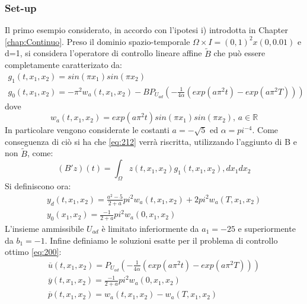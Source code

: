 \subsubsection{Set-up}
Il primo esempio considerato, in accordo con l'ipotesi i) introdotta in Chapter \ref{chap:Continuo}.
Preso il dominio spazio-temporale $\Omega \times I = (0,1)^2 x(0,0.01)$ e d=1, si considera l'operatore di controllo lineare affine $\tilde{B}$ che può essere completamente caratterizato da:
{\renewcommand\arraystretch{2}
\begin{equation}
\begin{array}{c}
g_1(t,x_1,x_2) = sin({\pi}x_1)sin({\pi}x_2)\\
g_0(t,x_1,x_2) = -{\pi}^2w_a(t,x_1,x_2) - BP_{U_{ad}} \left( -\frac{1}{4\alpha}(exp(a{\pi}^2t)-exp(a{\pi}^2T)) \right)
\end{array}
\label{eq:500}
\end{equation}
}
dove
\begin{equation}
w_a(t,x_1,x_2) = exp(a{\pi}^2t)sin({\pi}x_1)sin({\pi}x_2) \text{, } a \in \mathbb{R}
\label{eq:501}
\end{equation}
In particolare vengono considerate le costanti $a=-\sqrt{5}$ ed $\alpha={pi}^{-4}$.
Come conseguenza di ciò si ha che \ref{eq:212} verrà riscritta, utilizzando l'aggiunto di B e non $\tilde{B}$, come:
\begin{equation}
(B'z)(t) = \int_{\Omega} z(t,x_1,x_2)g_1(t,x_1,x_2) ,dx_1dx_2
\label{eq:502}
\end{equation}
Si definiscono ora:
{\renewcommand\arraystretch{2}
\begin{equation}
\begin{array}{c}
y_d(t,x_1,x_2) = \frac{a^2 - 5}{2 + a}{pi}^2w_a(t,x_1,x_2) + 2{pi}^2w_a(T,x_1,x_2) \\
y_0(x_1,x_2) = \frac{- 1}{2 + a}{pi}^2w_a(0,x_1,x_2)
\end{array}
\label{eq:503}
\end{equation}
}
L'insieme ammissibile $U_{ad}$ è limitato inferiormente da $a_1=-25$ e superiormente da $b_1=-1$.
Infine definiamo le soluzioni esatte per il problema di controllo ottimo \ref{eq:200}:
{\renewcommand\arraystretch{2}
\begin{equation}
\begin{array}{c}
\overline{u}(t,x_1,x_2) = P_{U_{ad}} \left( -\frac{1}{4\alpha}(exp(a{\pi}^2t)-exp(a{\pi}^2T)) \right) \\
\overline{y}(t,x_1,x_2) = \frac{- 1}{2 + a}{pi}^2w_a(0,x_1,x_2) \\
\overline{p}(t,x_1,x_2) = w_a(t,x_1,x_2) - w_a(T,x_1,x_2)
\end{array}
\label{eq:504}
\end{equation}
}

